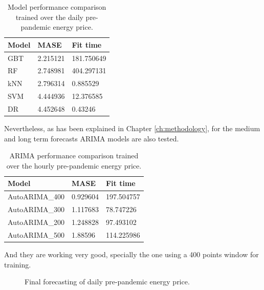 \begin{table}[H]
\centering
\begin{tabular}{l|l|l}
\hline
Model & MASE     & Fit time   \\ \hline
GBT   & 2.215121 & 181.750649 \\
RF    & 2.748981 & 404.297131 \\
kNN   & 2.796314 & 0.885529   \\
SVM   & 4.444936 & 12.376585  \\
DR    & 4.452648 & 0.43246    \\ \hline
\end{tabular}
\caption{Model performance comparison trained over the daily pre-pandemic energy price.}
\label{tab:cv-daily-prep}
\end{table}

Nevertheless, as has been explained in Chapter \ref{ch:methodology}, for the medium and long term forecasts ARIMA models are also tested.

\begin{table}[H]
\centering
\begin{tabular}{@{}l|l|l@{}}
\toprule
Model          & MASE     & Fit time   \\ \midrule
AutoARIMA\_400 & 0.929604 & 197.504757 \\
AutoARIMA\_300 & 1.117683 & 78.747226  \\
AutoARIMA\_200 & 1.248828 & 97.493102  \\
AutoARIMA\_500 & 1.88596  & 114.225986 \\ \bottomrule
\end{tabular}
\caption{ARIMA performance comparison trained over the hourly pre-pandemic energy price.}
\label{tab:arima-daily-prep}
\end{table}

And they are working very good, specially the one using a 400 points window for training.

\begin{figure}[H]
\centering
    \caption{Final forecasting of daily pre-pandemic energy price.}
    \label{fig:forecast-arima-daily-pre}
\end{figure}

